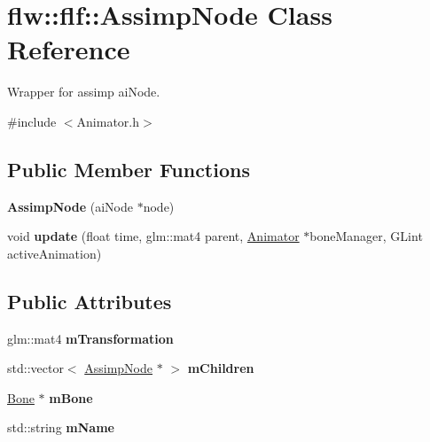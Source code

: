 \hypertarget{classflw_1_1flf_1_1AssimpNode}{}\section{flw\+:\+:flf\+:\+:Assimp\+Node Class Reference}
\label{classflw_1_1flf_1_1AssimpNode}


Wrapper for assimp ai\+Node.  




{\ttfamily \#include $<$Animator.\+h$>$}

\subsection*{Public Member Functions}
\begin{DoxyCompactItemize}
\item 
{\bfseries Assimp\+Node} (ai\+Node $\ast$node)\hypertarget{classflw_1_1flf_1_1AssimpNode_ad0adee9b1a17a63a9fb0c1e449d54552}{}\label{classflw_1_1flf_1_1AssimpNode_ad0adee9b1a17a63a9fb0c1e449d54552}

\item 
void {\bfseries update} (float time, glm\+::mat4 parent, \hyperlink{classflw_1_1flf_1_1Animator}{Animator} $\ast$bone\+Manager, G\+Lint active\+Animation)\hypertarget{classflw_1_1flf_1_1AssimpNode_a75d8886e4fddb9bb210387181e9b0279}{}\label{classflw_1_1flf_1_1AssimpNode_a75d8886e4fddb9bb210387181e9b0279}

\end{DoxyCompactItemize}
\subsection*{Public Attributes}
\begin{DoxyCompactItemize}
\item 
glm\+::mat4 {\bfseries m\+Transformation}\hypertarget{classflw_1_1flf_1_1AssimpNode_a4ca78b6a9e1d3cd6bc6b026ad59dd299}{}\label{classflw_1_1flf_1_1AssimpNode_a4ca78b6a9e1d3cd6bc6b026ad59dd299}

\item 
std\+::vector$<$ \hyperlink{classflw_1_1flf_1_1AssimpNode}{Assimp\+Node} $\ast$ $>$ {\bfseries m\+Children}\hypertarget{classflw_1_1flf_1_1AssimpNode_a22722cf413e1aba559c6014d320eceac}{}\label{classflw_1_1flf_1_1AssimpNode_a22722cf413e1aba559c6014d320eceac}

\item 
\hyperlink{classflw_1_1flf_1_1Bone}{Bone} $\ast$ {\bfseries m\+Bone}\hypertarget{classflw_1_1flf_1_1AssimpNode_aa97e88c3b82facef9b60f12699334d6a}{}\label{classflw_1_1flf_1_1AssimpNode_aa97e88c3b82facef9b60f12699334d6a}

\item 
std\+::string {\bfseries m\+Name}\hypertarget{classflw_1_1flf_1_1AssimpNode_ad846462ce02ceced39f7c84c778c6157}{}\label{classflw_1_1flf_1_1AssimpNode_ad846462ce02ceced39f7c84c778c6157}

\end{DoxyCompactItemize}


